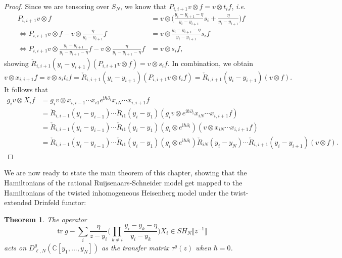 \documentclass[11pt]{report}
\newtheorem{theorem}{Theorem}[section]
\theoremstyle{definition}
\theoremstyle{remark}
\theoremstyle{remark}
\newcommand{\C}{\mathbb{C}}
\newcommand{\I}{\mathrm{i}}
\begin{document}
\begin{proof}
Since we are tensoring over $S_N$, we know that $P_{i,i+1} v \otimes f = v \otimes t_i f$, \emph{i.e.}
\begin{align*}
P_{i,i+1} v \otimes f &= v \otimes \bigg( \frac{y_i-y_{i+1}-\eta}{y_i-y_{i+1}} s_i + \frac{\eta}{y_i-y_{i+1}} \bigg) f \\
\Leftrightarrow P_{i,i+1} v \otimes f - v \otimes \frac{\eta}{y_i-y_{i+1}} f &= v \otimes \frac{y_i-y_{i+1}-\eta}{y_i-y_{i+1}} s_i f \\
\Leftrightarrow P_{i,i+1} v \otimes \frac{y_i-y_{i+1}}{y_i-y_{i+1}-\eta} f - v \otimes \frac{\eta}{y_i-y_{i+1}-\eta} f &= v \otimes s_i f,
\end{align*}
showing $\check R_{i,i+1}(y_i-y_{i+1}) (P_{i,i+1} v \otimes f) = v \otimes s_i f$. In combination, we obtain
\begin{equation*}
v \otimes x_{i,i+1} f = v \otimes s_i t_i f = \check R_{i,i+1}(y_i-y_{i+1}) (P_{i,i+1} v \otimes t_i f) = \check R_{i,i+1}(y_i-y_{i+1})(v \otimes f).
\end{equation*}
It follows that
\begin{align*}
g_i v \otimes X_i f
&= g_i v \otimes x_{i,i-1} \cdots x_{i1} e^{\I \hbar \partial_i} x_{iN} \cdots x_{i,i+1} f \\
&= \check R_{i,i-1}(y_i-y_{i-1}) \cdots \check R_{i1}(y_i-y_1) (g_i v \otimes e^{\I \hbar \partial_i} x_{iN} \cdots x_{i,i+1} f) \\
&= \check R_{i,i-1}(y_i-y_{i-1}) \cdots \check R_{i1}(y_i-y_1) (g_i \otimes e^{\I \hbar \partial_i}) (v \otimes x_{iN} \cdots x_{i,i+1} f) \\
&= \check R_{i,i-1}(y_i-y_{i-1}) \cdots \check R_{i1}(y_i-y_1) (g_i \otimes e^{\I \hbar \partial_i}) \check R_{iN}(y_i-y_N) \cdots \check R_{i,i+1}(y_i-y_{i+1}) (v \otimes f).
\end{align*}
\end{proof}

We are now ready to state the main theorem of this chapter, showing that the Hamiltonians of the rational Ruijsenaars-Schneider model get mapped to the Hamiltonians of the twisted inhomogeneous Heisenberg model under the twist-extended Drinfeld functor:

\begin{theorem}
The operator
\begin{equation*}
\operatorname{tr} g - \sum_i \frac{\eta}{z-y_i} \bigg( \prod_{k \neq i} \frac{y_i-y_k-\eta}{y_i-y_k} \bigg) X_i \in S\ddot H_N\llbracket z^{-1} \rrbracket
\end{equation*}
acts on $D_{\ell,N}^g(\C[y_1,...,y_N])$ as the transfer matrix $\tau^g(z)$ when $\hbar = 0$.
\end{theorem}
\end{document}
